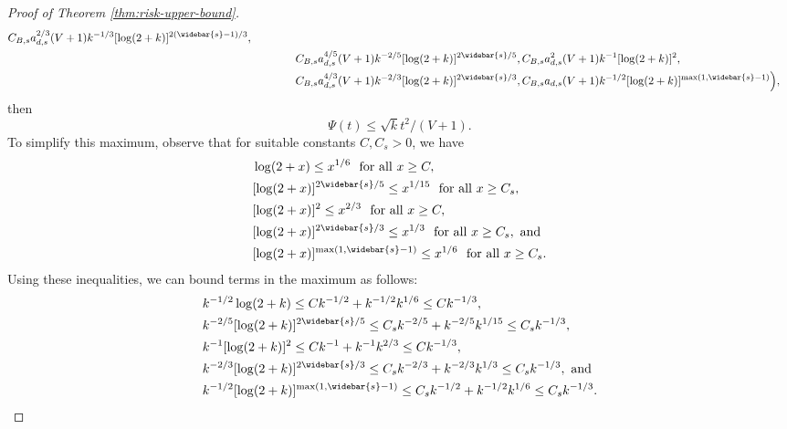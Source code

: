 \documentclass[10pt]{article}
\begin{document}
\begin{proof}[Proof of Theorem \ref{thm:risk-upper-bound}]
\begin{equation*}
\begin{aligned}
    C_{B, s} a_{d, s}^{2/3} (V + 1) k^{-1/3} [\log(2 + k)]^{2(\widebar{s} - 1)/3}, \\
    &\qquad \qquad
    C_{B, s} a_{d, s}^{4/5} (V + 1) k^{-2/5} [\log(2 + k)]^{2\widebar{s}/5}, 
    C_{B, s} a_{d, s}^2 (V + 1) k^{-1} [\log(2 + k)]^{2}, \\
    &\qquad \qquad 
    C_{B, s} a_{d, s}^{4/3} (V + 1) k^{-2/3} [\log(2 + k)]^{2\widebar{s}/3}, 
    C_{B, s} a_{d, s} (V + 1) k^{-1/2} [\log(2 + k)]^{\max(1, \widebar{s} - 1)}
    \Big),
\end{aligned}
\end{equation*}
then
\begin{equation*}
    \Psi(t) \le \sqrt{k} t^2 / (V + 1).
\end{equation*}
To simplify this maximum, observe that for suitable constants $C, C_s > 0$, we have
\begin{equation*}
\begin{aligned}
    &\log(2 + x) \le x^{1/6} \ \text{ for all } x \ge C, \\
    &[\log(2 + x)]^{2\widebar{s}/5} \le x^{1/15} \ \text{ for all } x \ge C_s, \\
    &[\log(2 + x)]^2 \le x^{2/3} \ \text{ for all } x \ge C, \\
    &[\log(2 + x)]^{2\widebar{s}/3} \le x^{1/3} \ \text{ for all } x \ge C_s, \text{ and} \\
    &[\log(2 + x)]^{\max(1, \widebar{s} - 1)} \le x^{1/6} \ \text{ for all } x \ge C_s.
\end{aligned}
\end{equation*}
Using these inequalities, we can bound terms in the maximum as follows:
\begin{equation*}
\begin{aligned}
    &k^{-1/2} \log(2 + k) 
    \le C k^{-1/2} + k^{-1/2} k^{1/6} 
    \le C k^{-1/3}, \\
    &k^{-2/5} [\log(2 + k)]^{2\widebar{s}/5}
    \le C_s k^{-2/5} + k^{-2/5} k^{1/15} 
    \le C_s k^{-1/3}, \\
    &k^{-1} [\log(2 + k)]^{2} 
    \le C k^{-1} + k^{-1} k^{2/3}
    \le C k^{-1/3}, \\
    &k^{-2/3} [\log(2 + k)]^{2\widebar{s}/3} 
    \le C_s k^{-2/3} + k^{-2/3} k^{1/3}
    \le C_s k^{-1/3}, \text{ and} \\
    &k^{-1/2} [\log(2 + k)]^{\max(1, \widebar{s} - 1)} 
    \le C_s k^{-1/2} + k^{-1/2} k^{1/6} 
    \le C_s k^{-1/3}.
\end{aligned}
\end{equation*}

\end{proof}
\end{document}

